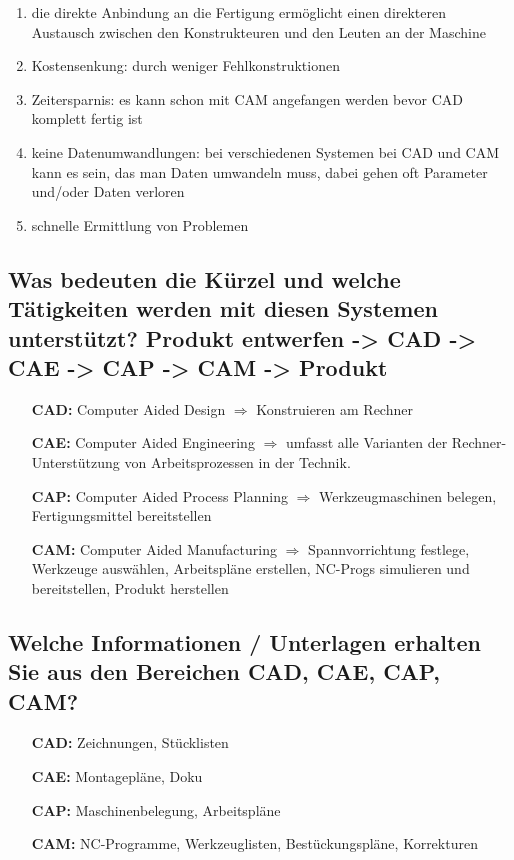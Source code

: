 \begin{enumerate}[1)]
\item die direkte Anbindung an die Fertigung ermöglicht einen direkteren Austausch zwischen den Konstrukteuren und den Leuten an der Maschine
\item Kostensenkung: durch weniger Fehlkonstruktionen
\item Zeitersparnis: es kann schon mit CAM angefangen werden bevor CAD komplett fertig ist
\item keine Datenumwandlungen: bei verschiedenen Systemen bei CAD und CAM kann es sein, das man Daten umwandeln muss, dabei gehen oft Parameter und/oder Daten verloren
\item schnelle Ermittlung von Problemen
\end{enumerate}

\newpage

\subsection*{Was bedeuten die Kürzel und welche Tätigkeiten werden mit diesen Systemen 
unterstützt?  
Produkt entwerfen -> CAD -> CAE -> CAP -> CAM -> Produkt }


\begin{itemize}
\item[\textbf{CAD:}] Computer Aided Design $\Rightarrow$ Konstruieren am Rechner
\item[\textbf{CAE:}] Computer Aided Engineering $\Rightarrow$ umfasst alle Varianten der Rechner-Unterstützung von Arbeitsprozessen in der Technik.
\item[\textbf{CAP:}] Computer Aided Process Planning $\Rightarrow$ Werkzeugmaschinen belegen, Fertigungsmittel bereitstellen
\item[\textbf{CAM:}] Computer Aided Manufacturing $\Rightarrow$ Spannvorrichtung festlege, Werkzeuge auswählen, Arbeitspläne erstellen, NC-Progs simulieren und bereitstellen, Produkt herstellen
\end{itemize}


\subsection*{Welche Informationen / Unterlagen erhalten Sie aus den Bereichen CAD, CAE, 
CAP, CAM? }

\begin{itemize}
\item[\textbf{CAD:}] Zeichnungen, Stücklisten
\item[\textbf{CAE:}] Montagepläne, Doku
\item[\textbf{CAP:}] Maschinenbelegung, Arbeitspläne
\item[\textbf{CAM:}] NC-Programme, Werkzeuglisten, Bestückungspläne, Korrekturen
\end{itemize}



